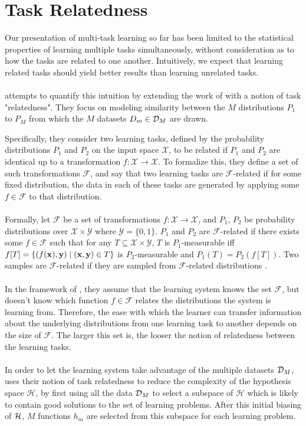 \section{Task Relatedness}
Our presentation of multi-task learning so far has been limited to the statistical properties of learning multiple tasks simultaneously, without consideration as to how the tasks are related to one another. Intuitively, we expect that learning related tasks should yield better results than learning unrelated tasks.
\\\\
\citet{ben2003} attempts to quantify this intuition by extending the work of \citet{baxter2000} with a notion of task "relatedness". They focus on modeling similarity between the $M$ distributions $P_1$ to $P_M$ from which the $M$ datasets $D_m \in \mathcal{D}_M$ are drawn.

Specifically, they consider two learning tasks, defined by the probability distributions $P_1$ and $P_2$ on the input space $\mathcal{X}$, to be related if $P_1$ and $P_2$ are identical up to a transformation $f: \mathcal{X} \to \mathcal{X}$. To formalize this, they define a set of such transformations $\mathcal{F}$, and say that two learning tasks are $\mathcal{F}$-related if for some fixed distribution, the data in each of these tasks are generated by applying some $f \in \mathcal{F}$ to that distribution.
\\\\
Formally, let $\mathcal{F}$ be a set of transformations $f: \mathcal{X} \to \mathcal{X}$, and $P_1$, $P_2$ be probability distributions over $\mathcal{X} \times \mathcal{Y}$ where $\mathcal{Y} = \{0,1\}$. $P_1$ and $P_2$ are $\mathcal{F}$-related if there exists some $f \in \mathcal{F}$ such that for any $T \subseteq \mathcal{X} \times \mathcal{Y}$, $T$ is $P_1$-measurable iff $f[T] = \{(f(\mathbf{x}), \mathbf{y}) \mid (\mathbf{x}, \mathbf{y}) \in T\}$ is $P_2$-measurable and $P_1(T) = P_2(f[T])$. Two samples are $\mathcal{F}$-related if they are sampled from $\mathcal{F}$-related distributions \citep{ben2003}.
\\\\
In the framework of \citet{ben2003}, they assume that the learning system knows the set $\mathcal{F}$, but doesn't know which function $f \in \mathcal{F}$ relates the distributions the system is learning from. Therefore, the ease with which the learner can transfer information about the underlying distributions from one learning task to another depends on the size of $\mathcal{F}$. The larger this set is, the looser the notion of relatedness between the learning tasks.
\\\\
In order to let the learning system take advantage of the multiple datasets $\mathcal{D}_M$, \citet{ben2003} uses their notion of task relatedness to reduce the complexity of the hypothesis space $\mathcal{H}$, by first using all the data $\mathcal{D}_M$ to select a subspace of $\mathcal{H}$ which is likely to contain good solutions to the set of learning problems. After this initial biasing of $\mathcal{H}$, $M$ functions $h_m$ are selected from this subspace for each learning problem.

